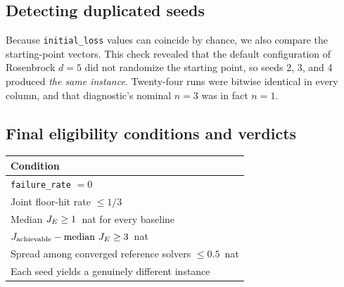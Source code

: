 \subsection{Detecting duplicated seeds}

Because \texttt{initial\_loss} values can coincide by chance, we also compare the
starting-point vectors. This check revealed that the default configuration of
Rosenbrock $d = 5$ did not randomize the starting point, so seeds 2, 3, and 4
produced \emph{the same instance}. Twenty-four runs were bitwise identical in
every column, and that diagnostic's nominal $n = 3$ was in fact $n = 1$.

\subsection{Final eligibility conditions and verdicts}

\begin{center}
\begin{tabular}{l}
\toprule
Condition \\
\midrule
\texttt{failure\_rate} $= 0$ \\
Joint floor-hit rate $\leq 1/3$ \\
Median $J_E \geq 1$~nat for every baseline \\
$J_{\text{achievable}} - \text{median } J_E \geq 3$~nat \\
Spread among converged reference solvers $\leq 0.5$~nat \\
Each seed yields a genuinely different instance \\
\bottomrule
\end{tabular}
\end{center}

